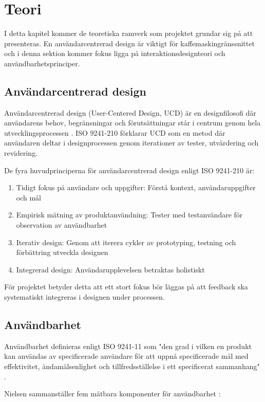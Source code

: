 \section{Teori}
I detta kapitel kommer de teoretiska ramverk som projektet grundar sig på att presenteras. En användarcentrerad design är viktigt för kaffemaskingränssnittet och i denna sektion kommer fokus ligga på interaktionsdesignteori och användbarhetsprinciper. 

\subsection{Användarcentrerad design}
Användarcentrerad design (User-Centered Design, UCD) är en designfilosofi där användarens behov, begränsningar och förutsättningar står i centrum genom hela utvecklingsprocessen \cite{sharp2019}. ISO 9241-210 förklarar UCD som en metod där användaren deltar i designprocessen genom iterationer av tester, utvärdering och revidering.

De fyra huvudprinciperna för användarcentrerad design enligt ISO 9241-210 är:
\begin{enumerate}
    \item Tidigt fokus på användare och uppgifter: Förstå kontext, användaruppgifter och mål
    \item Empirisk mätning av produktanvändning: Tester med testanvändare för observation av användbarhet
    \item Iterativ design: Genom att iterera cykler av prototyping, testning och förbättring utveckla designen
    \item Integrerad design: Användarupplevelsen betraktas holistiskt 
\end{enumerate}

För projektet betyder detta att ett stort fokus bör läggas på att feedback ska systematiskt integreras i designen under processen. 

\subsection{Användbarhet}

Användbarhet definieras enligt ISO 9241-11 som "den grad i vilken en produkt kan användas av specificerade användare för att uppnå specificerade mål med effektivitet, ändamålsenlighet och tillfredsställelse i ett specificerat sammanhang" \cite{iso9241}.

Nielsen sammanställer fem mätbara komponenter för användbarhet \cite{nielsen1993}:


